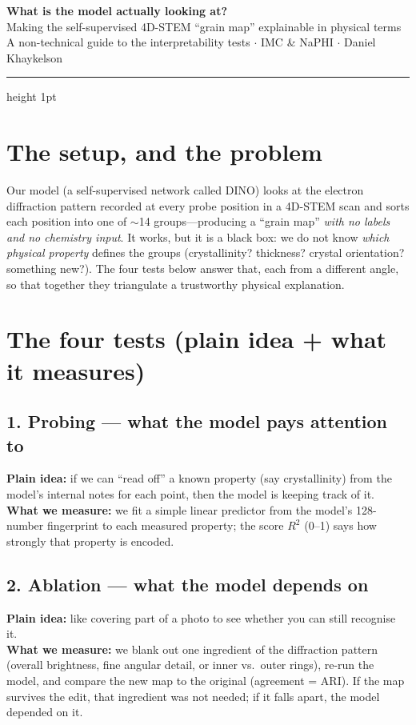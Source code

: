 \documentclass[11pt]{article}
\begin{document}
\pagestyle{empty}

\begin{center}
{\LARGE\bfseries\color{navy} What is the model actually looking at?}\\[3pt]
{\large\color{teal} Making the self-supervised 4D-STEM ``grain map'' explainable
in physical terms}\\[2pt]
{\small\color{ink} A non-technical guide to the interpretability tests
$\cdot$ IMC \& NaPHI $\cdot$ Daniel Khaykelson}
\end{center}
\vspace{2pt}
\hrule height 1pt
\vspace{8pt}

\section{The setup, and the problem}
Our model (a self-supervised network called DINO) looks at the electron
diffraction pattern recorded at every probe position in a 4D-STEM scan and
sorts each position into one of $\sim$14 groups---producing a ``grain map''
\emph{with no labels and no chemistry input}. It works, but it is a black box:
we do not know \emph{which physical property} defines the groups
(crystallinity? thickness? crystal orientation? something new?). The four
tests below answer that, each from a different angle, so that together they
triangulate a trustworthy physical explanation.

\section{The four tests (plain idea + what it measures)}

\subsection{1. Probing --- what the model pays attention to}
\textbf{Plain idea:} if we can ``read off'' a known property (say
crystallinity) from the model's internal notes for each point, then the model
is keeping track of it.\\
\textbf{What we measure:} we fit a simple linear predictor from the model's
128-number fingerprint to each measured property; the score $R^2$ (0--1) says
how strongly that property is encoded.

\subsection{2. Ablation --- what the model depends on}
\textbf{Plain idea:} like covering part of a photo to see whether you can still
recognise it.\\
\textbf{What we measure:} we blank out one ingredient of the diffraction
pattern (overall brightness, fine angular detail, or inner vs.\ outer rings),
re-run the model, and compare the new map to the original (agreement = ARI).
If the map survives the edit, that ingredient was not needed; if it falls
apart, the model depended on it.
\end{document}
